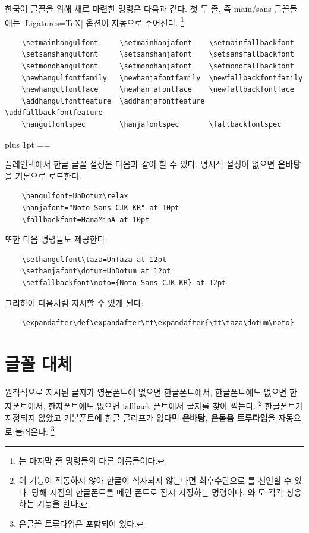 \documentclass[a4paper]{article}
\makeatletter
\def\logoko{\actualtag{ko, phoneme=[ˌkeɪˈəʊ]}{\textsf{k}\kern-.04em $o$}}
\def\luatex{\hologo{LuaTeX}\unskip}
\def\luatexko{\luatex\artifacttag{-}\logoko}
\def\texlive{\hologo{TeXLive}\unskip}
\def\hemph#1{\textsf{\bfseries #1}}
\newenvironment{plaintex}{%
  \par\smallskip
  \linespread{1.1}\small \narrower \parindent=0pt \parskip=2pt plus 1pt
  \topsep=\smallskipamount \@totalleftmargin=\leftskip
  \leavevmode\llap{\color{gray}\normalfont\hologo{plainTeX}\unskip\hskip1em}\ignorespaces
}{%
  \par
}
\makeatother
\begin{document}
한국어 글꼴을 위해 새로 마련한 명령은 다음과 같다.
첫 두 줄, 즉 main/sans 글꼴들에는 |Ligatures=TeX| 옵션이 자동으로 주어진다.%
\footnote{%
    는
  마지막 줄 명령들의 다른 이름들이다. }
\begin{verbatim}
    \setmainhangulfont     \setmainhanjafont    \setmainfallbackfont
    \setsanshangulfont     \setsanshanjafont    \setsansfallbackfont
    \setmonohangulfont     \setmonohanjafont    \setmonofallbackfont
    \newhangulfontfamily   \newhanjafontfamily  \newfallbackfontfamily
    \newhangulfontface     \newhanjafontface    \newfallbackfontface
    \addhangulfontfeature  \addhanjafontfeature \addfallbackfontfeature
    \hangulfontspec        \hanjafontspec       \fallbackfontspec
\end{verbatim}

\begin{plaintex}
  플레인텍에서 한글 글꼴 설정은 다음과 같이 할 수 있다.
  명시적 설정이 없으면 \hemph{은바탕}을 기본으로 로드한다.
\begin{verbatim}
    \hangulfont=UnDotum\relax
    \hanjafont="Noto Sans CJK KR" at 10pt
    \fallbackfont=HanaMinA at 10pt
\end{verbatim}

  또한 다음 명령들도 제공한다:
\begin{verbatim}
    \sethangulfont\taza=UnTaza at 12pt
    \sethanjafont\dotum=UnDotum at 12pt
    \setfallbackfont\noto={Noto Sans CJK KR} at 12pt
\end{verbatim}

  그리하여 다음처럼 지시할 수 있게 된다:
\begin{verbatim}
    \expandafter\def\expandafter\tt\expandafter{\tt\taza\dotum\noto}
\end{verbatim}
\end{plaintex}

\section{글꼴 대체}\label{sec:fontswitch}

원칙적으로  지시된 글자가 영문폰트에 없으면 한글폰트에서,
한글폰트에도 없으면 한자폰트에서, 한자폰트에도 없으면 fallback
폰트에서 글자를 찾아 찍는다.%
\footnote{%
  이 기능이 작동하지 않아 한글이 식자되지 않는다면 최후수단으로
  를 선언할 수 있다.
  당해 지점의 한글폰트를 메인 폰트로 잠시 지정하는 명령이다.
  와 도 각각 상응하는 기능을 한다.
}
한글폰트가 지정되지 않았고 기본폰트에 한글 글리프가 없다면
\hemph{은바탕, 은돋움 트루타입}을 자동으로 불러온다.%
\footnote{%
  은글꼴 트루타입은  포함되어 있다. }
\end{document}
